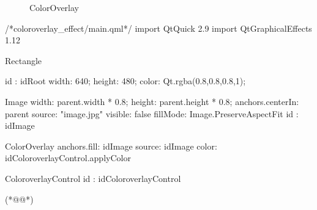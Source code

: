 \begin{figure}[htb] %
\marginnote{\setlength\fboxsep{2pt}\fbox{\footnotesize{\kaishu\figurename\,}\footnotesize{\ref{p000020}}}}\centering %
\setlength\fboxsep{0pt} %
\caption{ColorOverlay} %
\label{p000020} %
\end{figure}


\label{f000054}    %
\FloatBarrier                                  %
\begin{thebookfilesourceone}[escapeinside={(*@}{@*)},
caption=GoodLuck,
title=\filesourcenumbernameone \thefilesourcenumber
]
/*coloroverlay_effect/main.qml*/
import QtQuick 2.9
import QtGraphicalEffects 1.12

Rectangle {

    id : idRoot
    width: 640;
    height: 480;
    color: Qt.rgba(0.8,0.8,0.8,1);

    Image{
        width: parent.width * 0.8;
        height: parent.height * 0.8;
        anchors.centerIn: parent
        source: "image.jpg"
        visible: false
        fillMode: Image.PreserveAspectFit
        id : idImage
    }

    ColorOverlay{
        anchors.fill: idImage
        source: idImage
        color: idColoroverlayControl.applyColor
    }

    ColoroverlayControl{
        id : idColoroverlayControl
    }

}(*@\marginpar[\hfill\setlength\fboxsep{2pt}\fbox{\footnotesize{\kaishu\parbox{1em}{\setlength{\baselineskip}{2pt}\filesourcenumbernameone}}\footnotesize{\thefilesourcenumber}}]{\setlength\fboxsep{2pt}\fbox{\footnotesize{\kaishu\parbox{1em}{\setlength{\baselineskip}{2pt}\filesourcenumbernameone}}\footnotesize{\thefilesourcenumber}}}@*)\end{thebookfilesourceone}          %
\addtocounter{lstlisting}{-1}   %


 









